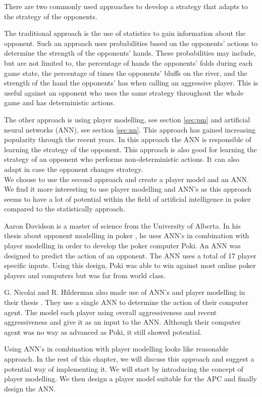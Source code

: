 There are two commonly used approaches to develop a strategy that adapts to the strategy of the opponents.

The traditional approach is the use of statistics to gain information about the opponent. Such an approach uses probabilities based on the opponents' actions to determine the strength of the opponents' hands. These probabilities may include, but are not limited to, the percentage of hands the opponents' folds during each game state, the percentage of times the opponents' bluffs on the river, and the strength of the hand the opponents' has when calling an aggressive player. This is useful against an opponent who uses the same strategy throughout the whole game and has deterministic actions.

The other approach is using player modelling, see section \ref{sec:pm} and artificial neural networks (ANN), see section \ref{sec:nn}. This approach has gained increasing popularity through the recent years. In this approach the ANN is responsible of learning the strategy of the opponent. This approach is also good for learning the strategy of an opponent who performs non-deterministic actions. It can also adapt in case the opponent changes strategy.\\

We choose to use the second approach and create a player model and an ANN. We find it more interesting to use player modelling and ANN's as this approach seems to have a lot of potential within the field of artificial intelligence in poker compared to the statistically approach.

Aaron Davidson is a master of science from the University of Alberta. In his thesis about opponent modelling in poker \cite{opp-mod}, he uses ANN's in combination with player modelling in order to develop the poker computer Poki. An ANN was designed to predict the action of an opponent. The ANN uses a total of 17 player specific inputs. Using this design, Poki was able to win against most online poker players and computers but was far from world class.

G. Nicolai and R. Hilderman also made use of ANN's and player modelling in their thesis \cite{poker-agents}. They use a single ANN to determine the action of their computer agent. The model each player using overall aggressiveness and recent aggressiveness and give it as an input to the ANN. Although their computer agent was no way as advanced as Poki, it still showed potential.

Using ANN's in combination with player modelling looks like reasonable approach. In the rest of this chapter, we will discuss this approach and suggest a potential way of implementing it. We will start by introducing the concept of player modelling. We then design a player model suitable for the APC and finally design the ANN.

